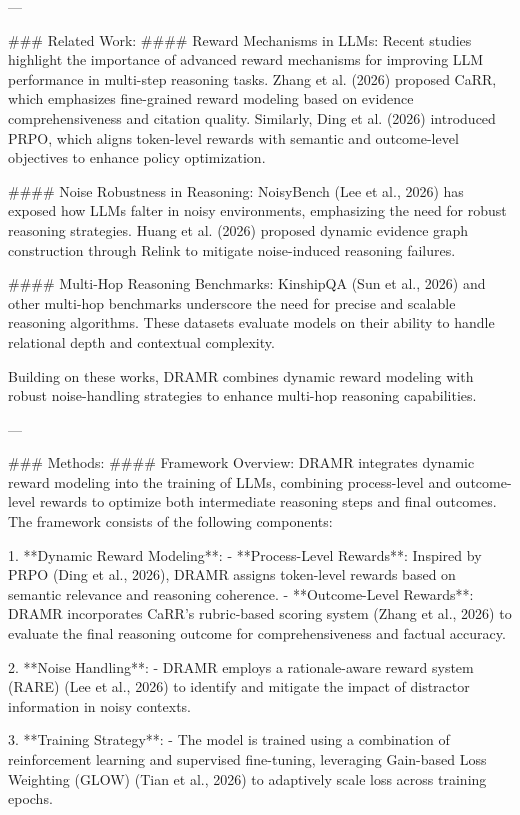 ---

### Related Work:
#### Reward Mechanisms in LLMs:
Recent studies highlight the importance of advanced reward mechanisms for improving LLM performance in multi-step reasoning tasks. Zhang et al. (2026) proposed CaRR, which emphasizes fine-grained reward modeling based on evidence comprehensiveness and citation quality. Similarly, Ding et al. (2026) introduced PRPO, which aligns token-level rewards with semantic and outcome-level objectives to enhance policy optimization.

#### Noise Robustness in Reasoning:
NoisyBench (Lee et al., 2026) has exposed how LLMs falter in noisy environments, emphasizing the need for robust reasoning strategies. Huang et al. (2026) proposed dynamic evidence graph construction through Relink to mitigate noise-induced reasoning failures.

#### Multi-Hop Reasoning Benchmarks:
KinshipQA (Sun et al., 2026) and other multi-hop benchmarks underscore the need for precise and scalable reasoning algorithms. These datasets evaluate models on their ability to handle relational depth and contextual complexity.

Building on these works, DRAMR combines dynamic reward modeling with robust noise-handling strategies to enhance multi-hop reasoning capabilities.

---

### Methods:
#### Framework Overview:
DRAMR integrates dynamic reward modeling into the training of LLMs, combining process-level and outcome-level rewards to optimize both intermediate reasoning steps and final outcomes. The framework consists of the following components:

1. **Dynamic Reward Modeling**:
   - **Process-Level Rewards**: Inspired by PRPO (Ding et al., 2026), DRAMR assigns token-level rewards based on semantic relevance and reasoning coherence.
   - **Outcome-Level Rewards**: DRAMR incorporates CaRR's rubric-based scoring system (Zhang et al., 2026) to evaluate the final reasoning outcome for comprehensiveness and factual accuracy.

2. **Noise Handling**:
   - DRAMR employs a rationale-aware reward system (RARE) (Lee et al., 2026) to identify and mitigate the impact of distractor information in noisy contexts.

3. **Training Strategy**:
   - The model is trained using a combination of reinforcement learning and supervised fine-tuning, leveraging Gain-based Loss Weighting (GLOW) (Tian et al., 2026) to adaptively scale loss across training epochs.

